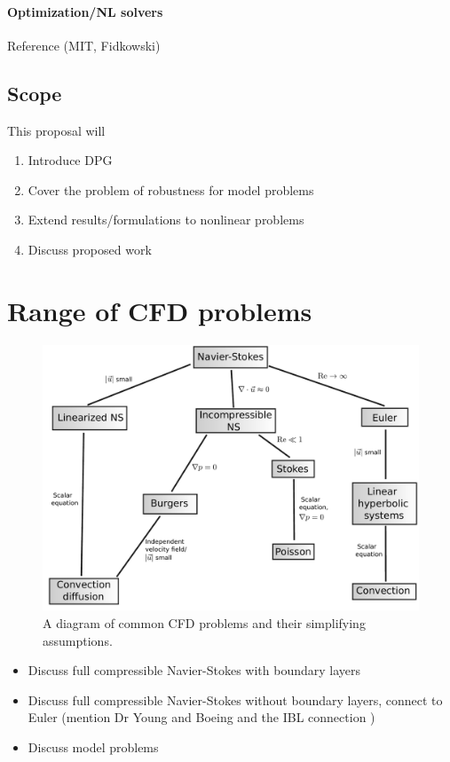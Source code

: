 \documentclass{report}
\begin{document}
\subsubsection{Optimization/NL solvers}

Reference (MIT, Fidkowski)


\section{Scope}

This proposal will
\begin{enumerate}
\item Introduce DPG
\item Cover the problem of robustness for model problems
\item Extend results/formulations to nonlinear problems
\item Discuss proposed work
\end{enumerate}

\chapter{Range of CFD problems}

\begin{figure}[!h]
\centering
\includegraphics[scale=.45]{figs/CFD_tree.pdf}
\caption{A diagram of common CFD problems and their simplifying assumptions.}
\end{figure}

\begin{itemize}
\item Discuss full compressible Navier-Stokes with boundary layers
\item Discuss full compressible Navier-Stokes without boundary layers, connect to Euler (mention Dr Young and Boeing and the IBL connection \cite{BoeingDrela})
\item Discuss model problems
\end{itemize}
\end{document}
